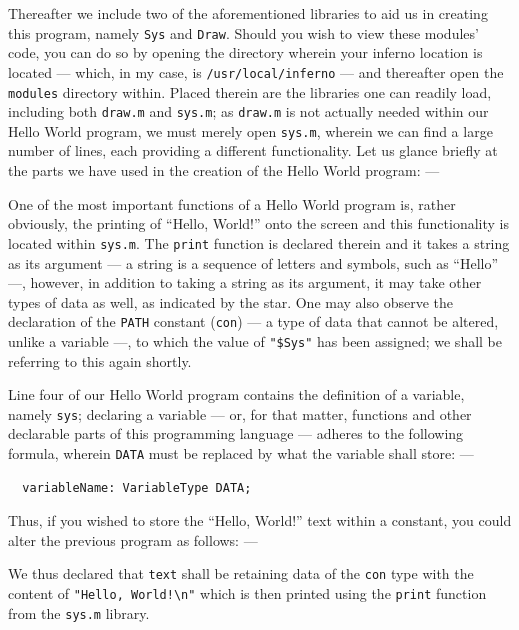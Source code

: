 \documentclass[a5paper,twoside,12pt]{report}
\begin{document}
Thereafter we include two of the aforementioned libraries to aid us in creating this program, namely \texttt{Sys} and \texttt{Draw}. Should you wish to view these modules' code, you can do so by opening the directory wherein your inferno location is located — which, in my case, is \texttt{/usr/local/inferno} — and thereafter open the \texttt{modules} directory within. Placed therein are the libraries one can readily load, including both \texttt{draw.m} and \texttt{sys.m}; as \texttt{draw.m} is not actually needed within our Hello World program, we must merely open \texttt{sys.m}, wherein we can find a large number of lines, each providing a different functionality. Let us glance briefly at the parts we have used in the creation of the Hello World program: —

\label{sys.m}


One of the most important functions of a Hello World program is, rather obviously, the printing of ``Hello, World!'' onto the screen and this functionality is located within \texttt{sys.m}. The \texttt{print} function is declared therein and it takes a string as its argument — a string is a sequence of letters and symbols, such as ``Hello'' —, however, in addition to taking a string as its argument, it may take other types of data as well, as indicated by the star. One may also observe the declaration of the \texttt{PATH} constant (\texttt{con}) — a type of data that cannot be altered, unlike a variable —, to which the value of \texttt{"\$Sys"} has been assigned; we shall be referring to this again shortly.

Line four of our Hello World program contains the definition of a variable, namely \texttt{sys}; declaring a variable — or, for that matter, functions and other declarable parts of this programming language — adheres to the following formula, wherein \texttt{DATA} must be replaced by what the variable shall store: —

\begin{lstlisting}
  variableName: VariableType DATA;
\end{lstlisting}

Thus, if you wished to store the ``Hello, World!'' text within a constant, you could alter the previous program as follows: —



We thus declared that \texttt{text} shall be retaining data of the \texttt{con} type with the content of \texttt{"Hello, World!\textbackslash n"} which is then printed using the \texttt{print} function from the \texttt{sys.m} library.
\end{document}
